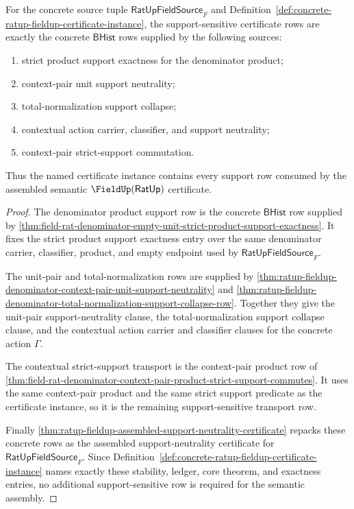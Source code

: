 \begin{theorem}
\label{thm:ratup-fieldup-support-neutrality-row-completeness}
For the concrete source tuple $\mathsf{RatUpFieldSource}_F$ and
Definition~\ref{def:concrete-ratup-fieldup-certificate-instance}, the
support-sensitive certificate rows are exactly the concrete $\mathsf{BHist}$
rows supplied by the following sources:
\begin{enumerate}
  \item strict product support exactness for the denominator product;
  \item context-pair unit support neutrality;
  \item total-normalization support collapse;
  \item contextual action carrier, classifier, and support neutrality;
  \item context-pair strict-support commutation.
\end{enumerate}
Thus the named certificate instance contains every support row consumed by the
assembled semantic $\FieldUp(\mathsf{RatUp})$ certificate.
\end{theorem}
\begin{proof}
The denominator product support row is the concrete $\mathsf{BHist}$ row
supplied by
\autoref{thm:field-rat-denominator-empty-unit-strict-product-support-exactness}.
It fixes the strict product support exactness entry over the same denominator
carrier, classifier, product, and empty endpoint used by
$\mathsf{RatUpFieldSource}_F$.

The unit-pair and total-normalization rows are supplied by
\autoref{thm:ratup-fieldup-denominator-context-pair-unit-support-neutrality}
and
\autoref{thm:ratup-fieldup-denominator-total-normalization-support-collapse-row}.
Together they give the unit-pair support-neutrality clause, the
total-normalization support collapse clause, and the contextual action carrier
and classifier clauses for the concrete action $\Gamma$.

The contextual strict-support transport is the context-pair product row of
\autoref{thm:field-rat-denominator-context-pair-product-strict-support-commutes}.
It uses the same context-pair product and the same strict support predicate as
the certificate instance, so it is the remaining support-sensitive transport
row.

Finally
\autoref{thm:ratup-fieldup-assembled-support-neutrality-certificate} repacks
these concrete rows as the assembled support-neutrality certificate for
$\mathsf{RatUpFieldSource}_F$. Since
Definition~\ref{def:concrete-ratup-fieldup-certificate-instance} names exactly
these stability, ledger, core theorem, and exactness entries, no additional
support-sensitive row is required for the semantic assembly.
\end{proof}

